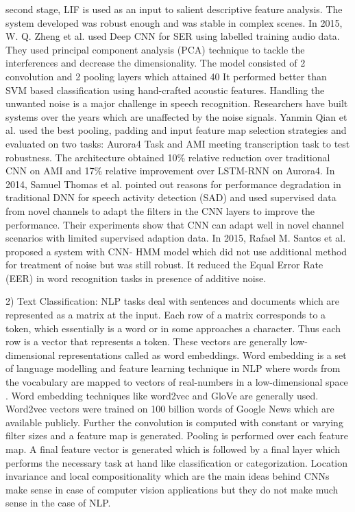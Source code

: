 \documentclass[12pt]{article}
\begin{document}
{{second stage, LIF is used as an input to salient descriptive
feature analysis. The system developed was robust enough
and was stable in complex scenes. In 2015, W. Q. Zheng et
al.  used Deep CNN for SER using labelled training
audio data. They used principal component analysis (PCA)
technique to tackle the interferences and decrease the
dimensionality. The model consisted of 2 convolution and 2
pooling layers which attained 40%
It performed better than SVM based classification using
hand-crafted acoustic features.
Handling the unwanted noise is a major challenge in
speech recognition. Researchers have built systems over the
years which are unaffected by the noise signals. Yanmin
Qian et al. used the best pooling, padding and input
feature map selection strategies and evaluated on two tasks:
Aurora4 Task and AMI meeting transcription task to test
robustness. The architecture obtained 10\% relative
reduction over traditional CNN on AMI and 17\% relative
improvement over LSTM-RNN on Aurora4. In 2014,
Samuel Thomas et al. pointed out reasons for
performance degradation in traditional DNN for speech
activity detection (SAD) and used supervised data from
novel channels to adapt the filters in the CNN layers to
improve the performance. Their experiments show that
CNN can adapt well in novel channel scenarios with limited
supervised adaption data. In 2015, Rafael M. Santos et al.
 proposed a system with CNN- HMM model which
did not use additional method for treatment of noise but was
still robust. It reduced the Equal Error Rate (EER) in word
recognition tasks in presence of additive noise.

2) Text Classification: NLP tasks deal with sentences
and documents which are represented as a matrix at the
input. Each row of a matrix corresponds to a token, which
essentially is a word or in some approaches a character.
Thus each row is a vector that represents a token. These
vectors are generally low-dimensional representations
called as word embeddings. Word embedding is a set of
language modelling and feature learning technique in NLP
where words from the vocabulary are mapped to vectors of
real-numbers in a low-dimensional space . Word
embedding techniques like word2vec and GloVe
are generally used. Word2vec vectors were trained on 100
billion words of Google News which are available publicly.
Further the convolution is computed with constant or
varying filter sizes and a feature map is generated. Pooling
is performed over each feature map. A final feature vector
is generated which is followed by a final layer which
performs the necessary task at hand like classification or
categorization.
Location
invariance
and
local
compositionality which are the main ideas behind CNNs
make sense in case of computer vision applications but they
do not make much sense in the case of NLP.




}}
\end{document}
